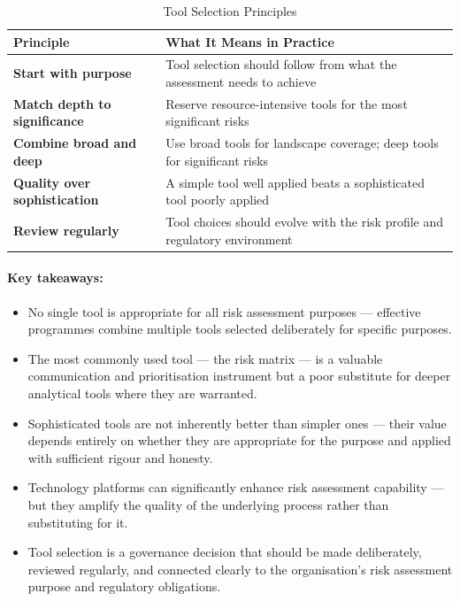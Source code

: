 \begin{table}[H]
  \centering
  \renewcommand{\arraystretch}{1.5}
  \begin{tabularx}{\textwidth}{ | >{\raggedright\arraybackslash}p{} 
                                | >{\raggedright\arraybackslash}X | }
    \hline
    \textbf{Principle} & \textbf{What It Means in Practice} \\
    \hline
    \textbf{Start with purpose} & Tool selection should follow from what the assessment needs to achieve\\
    \hline
    \textbf{Match depth to significance} & Reserve resource-intensive tools for the most significant risks\\
    \hline
    \textbf{Combine broad and deep} & Use broad tools for landscape coverage; deep tools for significant risks\\
    \hline
    \textbf{Quality over sophistication} & A simple tool well applied beats a sophisticated tool poorly applied\\
    \hline
    \textbf{Review regularly} & Tool choices should evolve with the risk profile and regulatory environment\\
    \hline
  \end{tabularx}
  \caption{Tool Selection Principles}
\end{table}

\paragraph{Key takeaways:}
\begin{itemize}
  \item{No single tool is appropriate for all risk assessment purposes — effective programmes combine multiple tools selected deliberately for specific purposes.}
  \item{The most commonly used tool — the risk matrix — is a valuable communication and prioritisation instrument but a poor substitute for deeper analytical tools where they are warranted.}
  \item{Sophisticated tools are not inherently better than simpler ones — their value depends entirely on whether they are appropriate for the purpose and applied with sufficient rigour and honesty.}
  \item{Technology platforms can significantly enhance risk assessment capability — but they amplify the quality of the underlying process rather than substituting for it.}
  \item{Tool selection is a governance decision that should be made deliberately, reviewed regularly, and connected clearly to the organisation's risk assessment purpose and regulatory obligations.}
\end{itemize}

